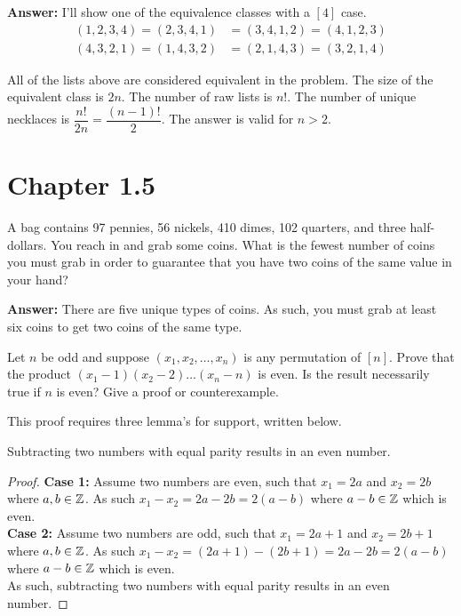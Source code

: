 \documentclass{article}
\begin{document}
\textbf{Answer:}
I'll show one of the equivalence classes with a $[4]$ case.
\begin{align*}
    (1, 2, 3, 4) = (2, 3, 4, 1) &= (3, 4, 1, 2) = (4, 1, 2, 3) \\
    (4, 3, 2, 1) = (1, 4, 3, 2) &= (2, 1, 4, 3) = (3, 2, 1, 4)
\end{align*}

All of the lists above are considered equivalent in the problem. The size of the equivalent class is $2n$. The number of raw lists is $n!$. The number of unique necklaces is $\dfrac{n!}{2n} = \dfrac{(n-1)!}{2}$. The answer is valid for $n > 2$.

\section{Chapter 1.5}
\setcounter{problem}{0}
\begin{problem} %
    A bag contains 97 pennies, 56 nickels, 410 dimes, 102 quarters, and three half-dollars. You reach in and grab some coins. What is the fewest number of coins you must grab in order to guarantee that you have two coins of the same value in your hand?
\end{problem}

\textbf{Answer:}
There are five unique types of coins. As such, you must grab at least six coins to get two coins of the same type.

\begin{problem} %
    Let $n$ be odd and suppose $(x_1, x_2, \dots , x_n)$ is any permutation of $[n]$. Prove that the product $(x_1 - 1)(x_2 - 2) \dots (x_n - n)$ is even. Is the result necessarily true if $n$ is even? Give a proof or counterexample.
\end{problem}

This proof requires three lemma's for support, written below.

\begin{lem}\label{lem:sub_even}
Subtracting two numbers with equal parity results in an even number.
\end{lem}

\begin{proof}
\textbf{Case 1:} Assume two numbers are even, such that $x_1 = 2a$ and $x_2 = 2b$ where $a, b \in \mathbb Z$. As such $x_1 - x_2 = 2a - 2b = 2(a-b)$ where $a-b \in \mathbb Z$ which is even.\\
\textbf{Case 2:} Assume two numbers are odd, such that $x_1 = 2a+1$ and $x_2 = 2b + 1$ where $a, b \in \mathbb Z$. As such $x_1 - x_2 = (2a + 1) - (2b + 1) = 2a - 2b = 2(a-b)$ where $a-b \in \mathbb Z$ which is even.\\
As such, subtracting two numbers with equal parity results in an even number.
\end{proof}
\end{document}

